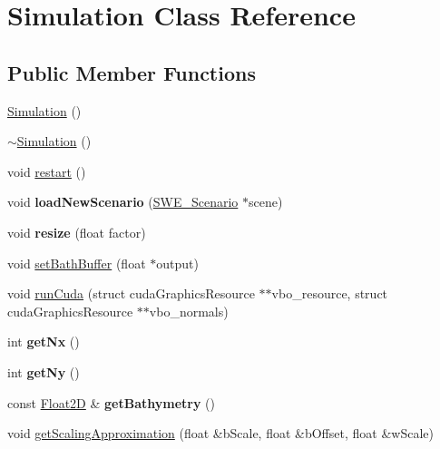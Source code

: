\hypertarget{classSimulation}{\section{Simulation Class Reference}
\label{classSimulation}
}
\subsection*{Public Member Functions}
\begin{DoxyCompactItemize}
\item 
\hyperlink{classSimulation_a5b224cc5b36bcc8eb29689aff223de41}{Simulation} ()
\item 
\hyperlink{classSimulation_a80fad3f57dfaf195a36f7bc49bc88279}{$\sim$\-Simulation} ()
\item 
void \hyperlink{classSimulation_a6be9990c6b2e31959254c8aa7b6df8a1}{restart} ()
\item 
\hypertarget{classSimulation_a0d9c93f7fbb498ac6f84d22baab8bbb0}{void {\bfseries load\-New\-Scenario} (\hyperlink{classSWE__Scenario}{S\-W\-E\-\_\-\-Scenario} $\ast$scene)}\label{classSimulation_a0d9c93f7fbb498ac6f84d22baab8bbb0}

\item 
\hypertarget{classSimulation_a349cba71f66fac2a159e3517ae7327ab}{void {\bfseries resize} (float factor)}\label{classSimulation_a349cba71f66fac2a159e3517ae7327ab}

\item 
void \hyperlink{classSimulation_a3d8e72877a4c982eaead748b8f8faf36}{set\-Bath\-Buffer} (float $\ast$output)
\item 
void \hyperlink{classSimulation_ab49e788b7f797a1bebdb3f5667cc95b9}{run\-Cuda} (struct cuda\-Graphics\-Resource $\ast$$\ast$vbo\-\_\-resource, struct cuda\-Graphics\-Resource $\ast$$\ast$vbo\-\_\-normals)
\item 
\hypertarget{classSimulation_a3e99b3b75a733fe887f1ea60307af78e}{int {\bfseries get\-Nx} ()}\label{classSimulation_a3e99b3b75a733fe887f1ea60307af78e}

\item 
\hypertarget{classSimulation_a58809b28521e41ba4b853cbf49dcd5a6}{int {\bfseries get\-Ny} ()}\label{classSimulation_a58809b28521e41ba4b853cbf49dcd5a6}

\item 
\hypertarget{classSimulation_a54ff6716f1d6d7a7627ee31062afa2c2}{const \hyperlink{classFloat2D}{Float2\-D} \& {\bfseries get\-Bathymetry} ()}\label{classSimulation_a54ff6716f1d6d7a7627ee31062afa2c2}

\item 
void \hyperlink{classSimulation_aeb1357e23e68821bb27922f3c97b04c2}{get\-Scaling\-Approximation} (float \&b\-Scale, float \&b\-Offset, float \&w\-Scale)
\end{DoxyCompactItemize}


